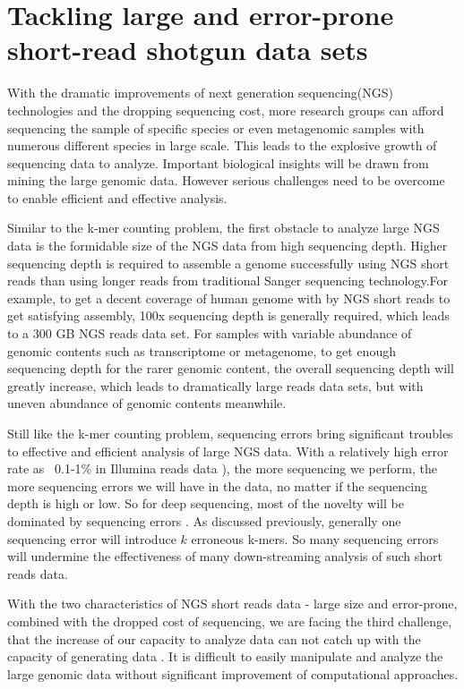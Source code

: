 


\section{Tackling large and error-prone short-read shotgun data sets}

With the dramatic improvements of next generation sequencing(NGS) technologies
and the dropping sequencing cost, more research groups can afford 
sequencing the sample of specific species or even
metagenomic samples with numerous different species in large scale\cite{pubmed19997069}. 
This leads to the explosive growth of sequencing data to analyze. 
Important biological insights will be drawn from mining the large genomic data.
However serious challenges need to be overcome to enable efficient and effective
analysis. 

Similar to the k-mer counting problem, the first obstacle to analyze large NGS data
is the formidable size of 
the NGS data from high sequencing depth. Higher sequencing depth is 
required to assemble a genome successfully using NGS short reads than using 
longer reads from traditional Sanger sequencing technology.For example, to get
a decent coverage of human genome with by NGS short reads to get satisfying assembly, 
100x sequencing depth is generally required, which leads to a 300 GB NGS reads 
data set\cite{pubmed21187386}. For samples with variable abundance of genomic 
contents such as transcriptome or metagenome, to get enough sequencing depth for
the rarer genomic content, the overall sequencing depth will greatly increase, 
which leads to dramatically large reads data sets, but with uneven
abundance of genomic contents meanwhile. 

Still like the k-mer counting problem, sequencing errors bring significant troubles
to effective and efficient analysis of large NGS data. With a relatively high 
error rate as ~0.1-1\% in Illumina reads data \cite{pubmed19997069}), the more 
sequencing we perform, the more sequencing errors we will have in the data, no 
matter if the sequencing depth is high or low. So for deep sequencing, most
of the novelty will be dominated by sequencing errors \cite{pubmed21245053}.
As discussed previously, generally one sequencing error will
introduce $k$ erroneous k-mers. So many sequencing errors will undermine the 
effectiveness of many down-streaming analysis of such short reads data.

With the two characteristics of NGS short reads data - large size and error-prone,
 combined with the dropped cost of sequencing, 
we are facing the third challenge, that the increase of our capacity to analyze data can not
catch up with the capacity of generating data \cite{pubmed20441614}.  It is difficult
to easily manipulate and analyze the large genomic data without significant improvement
of computational approaches.

